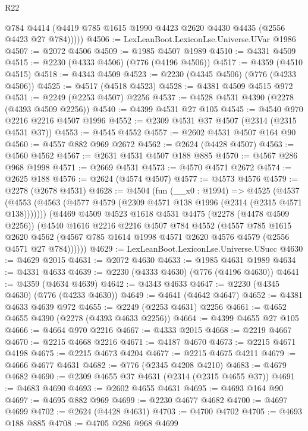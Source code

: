 \begin{lexlean}{R22}
\begin{coremodule}
          @784
          @4414
          (@4419 @785 @1615 @1990 @4423 @2620 @4430 @4435 (@2556 @4423 @27 @784)))))
@4506 := LexLeanBoot.LexiconLse.Universe.UVar @1986
@4507 := @2072 @4506
@4509 := @1985 @4507 @1989
@4510 := @4331 @4509
@4515 := @2230 (@4333 @4506) (@776 (@4196 @4506))
@4517 := @4359 (@4510 @4515)
@4518 := @4343 @4509
@4523 := @2230 (@4345 @4506) (@776 (@4233 @4506))
@4525 := @4517 (@4518 @4523)
@4528 := @4381 @4509 @4515 @972
@4531 := @2249 (@2253 @4507) @2256
@4537 := @4528 @4531 @4390 (@2278 (@4393 @4509 @2256))
@4540 := @4399 @4531 @27 @105
@4545 := @4540 @970 @2216 @2216 @4507 @1996
@4552 := @2309 @4531 @37 @4507 (@2314 (@2315 @4531 @37))
@4553 := @4545 @4552
@4557 := @2602 @4531 @4507 @164 @90
@4560 := @4557 @882 @969 @2672
@4562 := @2624 (@4428 @4507)
@4563 := @4560 @4562
@4567 := @2631 @4531 @4507 @188 @885
@4570 := @4567 @286 @968 @1998
@4571 := @2669 @4531
@4573 := @4570 @4571 @2672
@4574 := @2625 @188
@4576 := @2624 (@4574 @4507)
@4577 := @4573 @4576
@4579 := @2278 (@2678 @4531)
@4628 := @4504
    (fun (__x0 : @1994) =>
    @4525
      (@4537 (@4553 (@4563 (@4577 @4579 (@2309 @4571 @138 @1996 (@2314 (@2315 @4571 @138)))))))
      (@4469
        @4509
        @4523
        @1618
        @4531
        @4475
        (@2278 (@4478 @4509 @2256))
        (@4540
          @1616
          @2216
          @2216
          @4507
          @784
          @4552
          (@4557
            @785
            @1615
            @2620
            @4562
            (@4567 @785 @1614 @1998 @4571 @2620 @4576 @4579 (@2556 @4571 @27 @784))))))
@4629 := LexLeanBoot.LexiconLse.Universe.USucc
@4630 := @4629 @2015
@4631 := @2072 @4630
@4633 := @1985 @4631 @1989
@4634 := @4331 @4633
@4639 := @2230 (@4333 @4630) (@776 (@4196 @4630))
@4641 := @4359 (@4634 @4639)
@4642 := @4343 @4633
@4647 := @2230 (@4345 @4630) (@776 (@4233 @4630))
@4649 := @4641 (@4642 @4647)
@4652 := @4381 @4633 @4639 @972
@4655 := @2249 (@2253 @4631) @2256
@4661 := @4652 @4655 @4390 (@2278 (@4393 @4633 @2256))
@4664 := @4399 @4655 @27 @105
@4666 := @4664 @970 @2216
@4667 := @4333 @2015
@4668 := @2219 @4667
@4670 := @2215 @4668 @2216
@4671 := @4187 @4670
@4673 := @2215 @4671 @4198
@4675 := @2215 @4673 @4204
@4677 := @2215 @4675 @4211
@4679 := @4666 @4677 @4631
@4682 := @776 (@2345 @4208 @4210)
@4683 := @4679 @4682
@4690 := @2309 @4655 @37 @4631 (@2314 (@2315 @4655 @37))
@4691 := @4683 @4690
@4693 := @2602 @4655 @4631
@4695 := @4693 @164 @90
@4697 := @4695 @882 @969
@4699 := @2230 @4677 @4682
@4700 := @4697 @4699
@4702 := @2624 (@4428 @4631)
@4703 := @4700 @4702
@4705 := @4693 @188 @885
@4708 := @4705 @286 @968 @4699

\end{coremodule}
\end{lexlean}
